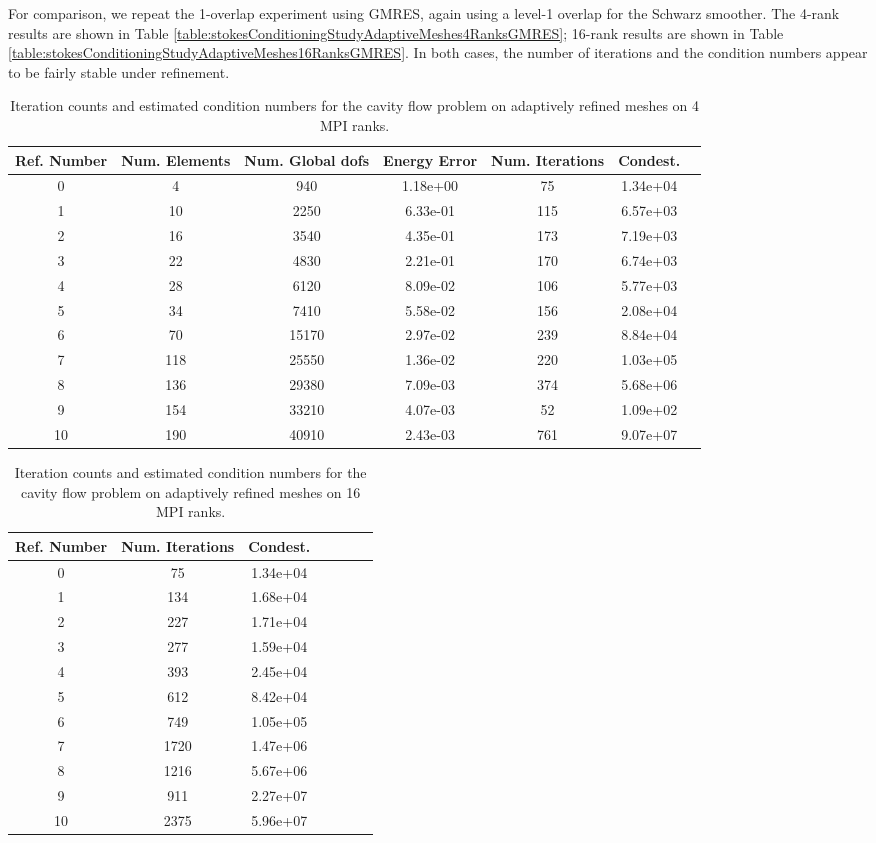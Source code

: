\documentclass[11pt]{amsart}
\begin{document}
For comparison, we repeat the 1-overlap experiment using GMRES, again using a level-1 overlap for the Schwarz smoother.  The 4-rank results are shown in Table \ref{table:stokesConditioningStudyAdaptiveMeshes4RanksGMRES}; 16-rank results are shown in Table \ref{table:stokesConditioningStudyAdaptiveMeshes16RanksGMRES}.  In both cases, the number of iterations and the condition numbers appear to be fairly stable under refinement.

\begin{table}
\begin{tabular}{ c  c  c  c  c  c c}
Ref. Number	&Num. Elements	& Num. Global dofs		&Energy Error	&Num. Iterations	&Condest.\\
\hline
0	&4	&940	&1.18e+00	&   75	&1.34e+04\\
1	&10	&2250	&6.33e-01	&  115	&6.57e+03\\
2	&16	&3540	&4.35e-01	&  173	&7.19e+03\\
3	&22	&4830	&2.21e-01	&  170	&6.74e+03\\
4	&28	&6120	&8.09e-02	&  106	&5.77e+03\\
5	&34	&7410	&5.58e-02	&  156	&2.08e+04\\
6	&70	&15170	&2.97e-02	&  239	&8.84e+04\\
7	&118	&25550	&1.36e-02	&  220	&1.03e+05\\
8	&136	&29380	&7.09e-03	&  374	&5.68e+06\\
9	&154	&33210	&4.07e-03	&   52	&1.09e+02\\
10 	&190	&40910	&2.43e-03	&  761	&9.07e+07\\
\end{tabular}
\caption{Iteration counts and estimated condition numbers for the cavity flow problem on adaptively refined meshes on 4 MPI ranks.}
\label{table:stokesConditioningStudyAdaptiveMeshes4Ranks}
\end{table}


\begin{table}
\begin{tabular}{ c  c  c  c  c  c c}
Ref. Number	&Num. Iterations	&Condest.\\
\hline
0	&75	&1.34e+04\\
1	&134	&1.68e+04\\
2	&227	&1.71e+04\\
3	&277	&1.59e+04\\
4	&393	&2.45e+04\\
5	&612	&8.42e+04\\
6	&749	&1.05e+05\\
7	&1720	&1.47e+06\\
8	&1216	&5.67e+06\\
9	&911	&2.27e+07\\
10 	&2375	&5.96e+07\\
\end{tabular}
\caption{Iteration counts and estimated condition numbers for the cavity flow problem on adaptively refined meshes on 16 MPI ranks.}
\label{table:stokesConditioningStudyAdaptiveMeshes16Ranks}
\end{table}
\end{document}
